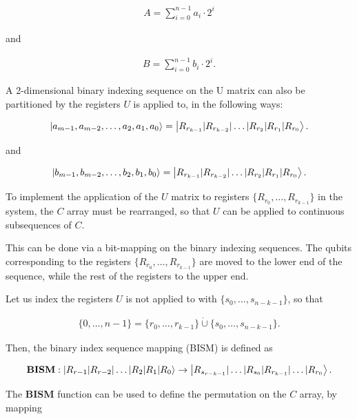 \begin{align*}
A = \sum\limits_{i=0}^{n-1}a_i\cdot{}2^{i}
\end{align*}

and

\begin{align*}
B = \sum\limits_{i=0}^{n-1}b_i\cdot{}2^{i}.
\end{align*}

A 2-dimensional binary indexing sequence on the U matrix can also be partitioned by the registers $U$ is applied to, in the following ways:

\begin{align*}
\ket{a_{m-1},a_{m-2},\dots{},a_2,a_1,a_0} = \ket{R_{r_{k-1}} | R_{r_{k-2}} | \dots{} | R_{r_2} | R_{r_1} | R_{r_0}}.
\end{align*}

and

\begin{align*}
\ket{b_{m-1},b_{m-2},\dots{},b_2,b_1,b_0} = \ket{R_{r_{k-1}} | R_{r_{k-2}} | \dots{} | R_{r_2} | R_{r_1} | R_{r_0}}.
\end{align*}

To implement the application of the $U$ matrix to registers $\{R_{r_0},\dots{},R_{r_{k-1}}\}$ in the system, the $C$ array must be rearranged, so that $U$ can be applied to continuous subsequences of $C$.

This can be done via a bit-mapping on the binary indexing sequences. The qubits corresponding to the registers $\{R_{r_0},\dots{},R_{r_{k-1}}\}$ are moved to the lower end of the sequence, while the rest of the registers to the upper end.

Let us index the registers $U$ is not applied to with $\{s_0, \dots{}, s_{n-k-1}\}$, so that

\begin{align*}
\{0, \dots{}, n-1\} = \{r_0, \dots{}, r_{k-1}\} \dot{\cup} \{s_0, \dots{}, s_{n-k-1}\}. 
\end{align*}

Then, the binary index sequence mapping (BISM) is defined as

\begin{align*}
\text{\textbf{BISM}}: \ket{R_{r-1} | R_{r-2} | \dots{} | R_2 | R_1 | R_0} \rightarrow \ket{R_{s_{r-k-1}} | \dots{} | R_{s_0} \mathbf{|} R_{r_{k-1}} | \dots{} | R_{r_0} }.
\end{align*}

The \textbf{BISM} function can be used to define the permutation on the $C$ array, by mapping

